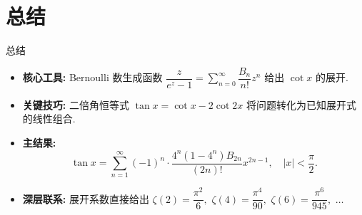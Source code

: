 
\section{总结}


\begin{frame}{总结}

\begin{itemize}
\item[{\larger[2] \color{red} \ding{43}}] \textbf{核心工具:} Bernoulli 数生成函数 $\dfrac{z}{e^z-1} = \sum\limits_{n=0}^\infty \dfrac{B_n}{n!} z^n$ 给出 $\cot x$ 的展开.

\pause
\vspace{0.6em}

\item[{\larger[2] \color{red} \ding{43}}] \textbf{关键技巧:} 二倍角恒等式 $\tan x = \cot x - 2\cot 2x$ 将问题转化为已知展开式的线性组合.

\pause
\vspace{0.5em}

\item[{\larger[2] \color{red} \ding{43}}] \textbf{主结果:}
\[
\tan x = \sum_{n=1}^\infty (-1)^n \cdot \frac{4^n(1-4^n)B_{2n}}{(2n)!} x^{2n-1}, \quad |x| < \frac{\pi}{2}.
\]

\pause
\vspace{0.4em}

\item[{\larger[2] \color{red} \ding{43}}] \textbf{深层联系:} 展开系数直接给出 $\zeta(2) = \dfrac{\pi^2}{6},$ $\zeta(4) = \dfrac{\pi^4}{90},$ $\zeta(6) = \dfrac{\pi^6}{945},$ $\ldots$
\end{itemize}

\end{frame}




